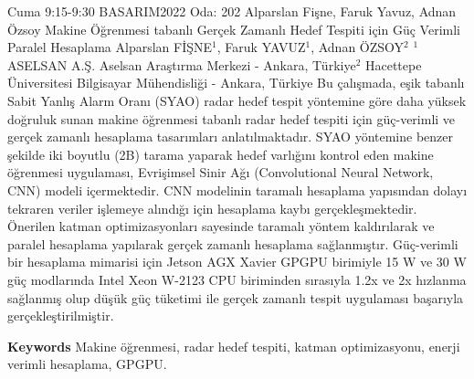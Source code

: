 
    \begin{abstract_basarim}
    {Cuma 9:15-9:30}
    {BASARIM2022}
    {Oda: 202}
    {Alparslan Fişne, Faruk Yavuz, Adnan Özsoy}
    {Makine Öğrenmesi tabanlı Gerçek Zamanlı Hedef Tespiti için Güç Verimli Paralel Hesaplama}
    {%
    Alparslan FİŞNE$^{1}$, Faruk YAVUZ$^{1}$, Adnan ÖZSOY$^{2}$}
    {%
    }
    {%
    $^1$ ASELSAN A.Ş. Aselsan Araştırma Merkezi - Ankara, Türkiye\newline{}$^2$ Hacettepe Üniversitesi Bilgisayar Mühendisliği - Ankara, Türkiye}
    Bu çalışmada, eşik tabanlı Sabit Yanlış Alarm Oranı (SYAO) radar hedef tespit yöntemine göre daha yüksek doğruluk sunan makine öğrenmesi tabanlı radar hedef tespiti için güç-verimli ve gerçek zamanlı hesaplama tasarımları anlatılmaktadır. SYAO yöntemine benzer şekilde iki boyutlu (2B) tarama yaparak hedef varlığını kontrol eden makine öğrenmesi uygulaması, Evrişimsel Sinir Ağı (Convolutional Neural Network, CNN) modeli içermektedir. CNN modelinin taramalı hesaplama yapısından dolayı tekraren veriler işlemeye alındığı için hesaplama kaybı gerçekleşmektedir. Önerilen katman optimizasyonları sayesinde taramalı yöntem kaldırılarak ve paralel hesaplama yapılarak gerçek zamanlı hesaplama sağlanmıştır. Güç-verimli bir hesaplama mimarisi için Jetson AGX Xavier GPGPU birimiyle 15 W ve 30 W güç modlarında Intel Xeon W-2123 CPU biriminden sırasıyla 1.2x ve 2x hızlanma sağlanmış olup düşük güç tüketimi ile gerçek zamanlı tespit uygulaması başarıyla gerçekleştirilmiştir. 
    
        \textbf{Keywords} \newline{}Makine öğrenmesi, radar hedef tespiti, katman optimizasyonu, enerji verimli hesaplama, GPGPU.
    \end{abstract_basarim}
    